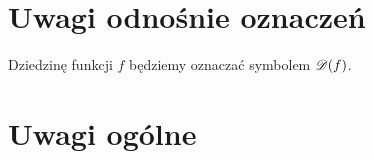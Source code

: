 \documentclass[a4paper,11pt]{article}
\numberwithin{equation}{section}
\begin{document}



















\section{Uwagi odnośnie oznaczeń}

\label{sec:Uwagi-odnosnie-oznaczen}



\noindent
Dziedzinę funkcji $f$ będziemy oznaczać symbolem $\mathcal{D}( f )$.

\VerSpaceFour





\section{Uwagi ogólne}
\end{document}
